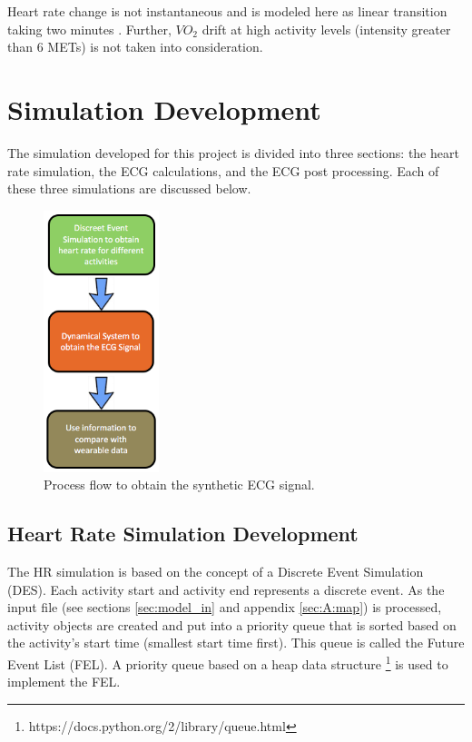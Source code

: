 \documentclass[paper=a4, fontsize=11pt]{scrartcl}
\numberwithin{equation}{section}		%
\numberwithin{figure}{section}			%
\numberwithin{table}{section}		    %
\begin{document}
Heart rate change is not instantaneous and is modeled here as linear transition taking two 
minutes \cite{hotehama2003simulation}\cite{koga1996pulmonary}\cite{carter2000effect}. Further,
$VO_2$ drift at high activity levels (intensity greater than 6 METs) 
\cite{hotehama2003simulation}\cite{carter2000effect} is not taken into consideration.

\section{Simulation Development} \label{sec:simdev}
The simulation developed for this project is divided into three sections: the heart rate
simulation, the ECG calculations, and the ECG post processing. Each of these three simulations
are discussed below.

\begin{figure}[H]
	\begin{center} 
		\includegraphics[height=3in,width=1.32in]{simulation_outline} 
		\caption{Process flow to obtain the synthetic ECG signal. \label{fig:sim_outline}} 
	\end{center} 
\end{figure}

\subsection{Heart Rate Simulation Development}\label{sec:simdev_hr}
The HR simulation is based on the concept of a Discrete Event Simulation (DES). Each activity
start and activity end represents a discrete event. As the input file (see sections 
\ref{sec:model_in} and appendix \ref{sec:A:map}) is processed, activity objects are created and 
put into a priority queue that is sorted based on the activity's start time (smallest start time
first). This queue is called the Future Event List (FEL). A priority queue based on a heap data 
structure \footnote{https://docs.python.org/2/library/queue.html} is used to implement the FEL. \\
\end{document}
